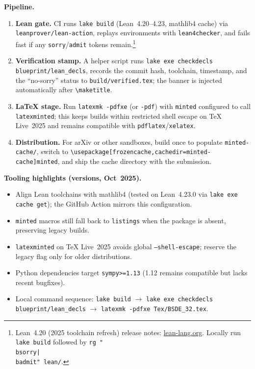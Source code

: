 \documentclass[11pt,letterpaper,oneside]{article}
\numberwithin{equation}{section}
\newcommand{\1}{\mathbf{1}}
\begin{document}
\begin{tcolorbox}[mathstyle]
  \textbf{Pipeline.}
  \begin{enumerate}[leftmargin=1.25em]
    \item \textbf{Lean gate.} CI runs \texttt{lake build} (Lean~4.20--4.23, mathlib4 cache) via \texttt{leanprover/lean-action}, replays environments with \texttt{lean4checker}, and fails fast if any \texttt{sorry}/\texttt{admit} tokens remain.\footnote{Lean~4.20 (2025 toolchain refresh) release notes: \href{https://lean-lang.org/doc/reference/latest/releases/v4.20.0/}{lean-lang.org}. Locally run \texttt{lake build} followed by \texttt{rg "\\bsorry|\\badmit" lean/}.}
    \item \textbf{Verification stamp.} A helper script runs \texttt{lake exe checkdecls blueprint/lean\_decls}, records the commit hash, toolchain, timestamp, and the ``no-sorry'' status to \texttt{build/verified.tex}; the banner is injected automatically after \texttt{\textbackslash maketitle}.
    \item \textbf{LaTeX stage.} Run \texttt{latexmk -pdfxe} (or \texttt{-pdf}) with \texttt{minted} configured to call \texttt{latexminted}; this keeps builds within restricted shell escape on TeX Live~2025 and remains compatible with \texttt{pdflatex}/\texttt{xelatex}.
    \item \textbf{Distribution.} For arXiv or other sandboxes, build once to populate \texttt{minted-cache/}, switch to \texttt{\textbackslash usepackage[frozencache,cachedir=minted-cache]{minted}}, and ship the cache directory with the submission.
  \end{enumerate}
  \textbf{Tooling highlights (versions, Oct~2025).}
  \begin{itemize}[leftmargin=1.25em]
    \item Align Lean toolchains with mathlib4 (tested on Lean~4.23.0 via \texttt{lake exe cache get}); the GitHub Action mirrors this configuration.
    \item \texttt{minted} macros still fall back to \texttt{listings} when the package is absent, preserving legacy builds.
    \item \texttt{latexminted} on TeX Live~2025 avoids global \texttt{--shell-escape}; reserve the legacy flag only for older distributions.
    \item Python dependencies target \texttt{sympy>=1.13} (1.12 remains compatible but lacks recent bugfixes).
    \item Local command sequence: \texttt{lake build} $\rightarrow$ \texttt{lake exe checkdecls blueprint/lean\_decls} $\rightarrow$ \texttt{latexmk -pdfxe Tex/BSDE\_32.tex}.
  \end{itemize}
\end{tcolorbox}
\end{document}
